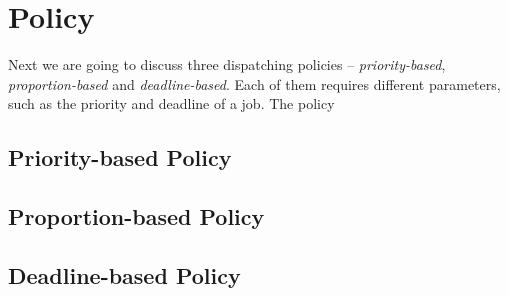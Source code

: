 \chapter{Policy}

Next we are going to discuss three dispatching policies --
\emph{priority-based}, \emph{proportion-based} and
\emph{deadline-based}. Each of them requires different parameters, such
as the priority and deadline of a job. The policy

\section{Priority-based Policy}

\section{Proportion-based Policy}

\section{Deadline-based Policy}
